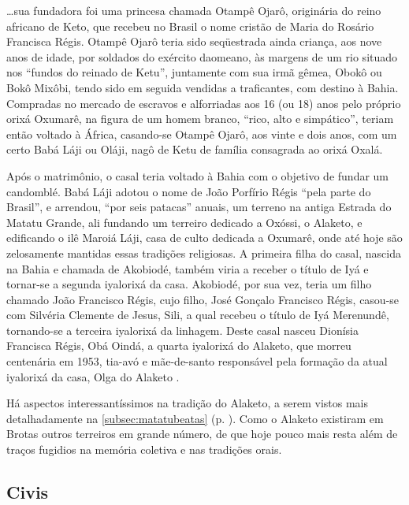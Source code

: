 \begin{citacao}
\dots sua fundadora foi uma princesa chamada Otampê Ojarô, originária do reino africano de Keto, que recebeu no Brasil o nome cristão de Maria do Rosário Francisca Régis. Otampê Ojarô teria sido seqüestrada ainda criança, aos nove anos de idade, por soldados do exército daomeano, às margens de um rio situado nos ``fundos do reinado de Ketu'', juntamente com sua irmã gêmea, Obokô ou Bokô Mixôbi, tendo sido em seguida vendidas a traficantes, com destino à Bahia. Compradas no mercado de escravos e alforriadas aos 16 (ou 18) anos pelo próprio orixá Oxumarê, na figura de um homem branco, ``rico, alto e simpático'', teriam então voltado à África, casando-se Otampê Ojarô, aos vinte e dois anos, com um certo Babá Láji ou Oláji, nagô de Ketu de família consagrada ao orixá Oxalá.

Após o matrimônio, o casal teria voltado à Bahia com o objetivo de fundar um candomblé. Babá Láji adotou o nome de João Porfírio Régis ``pela parte do Brasil'', e arrendou, ``por seis patacas'' anuais, um terreno na antiga Estrada do Matatu Grande, ali fundando um terreiro dedicado a Oxóssi, o Alaketo, e edificando o ilê Maroiá Láji, casa de culto dedicada a Oxumarê, onde até hoje são zelosamente mantidas essas tradições religiosas. A primeira filha do casal, nascida na Bahia e chamada de Akobiodé, também viria a receber o título de Iyá e tornar-se a segunda iyalorixá da casa. Akobiodé, por sua vez, teria um filho chamado João Francisco Régis, cujo filho, José Gonçalo Francisco Régis, casou-se com Silvéria Clemente de Jesus, Sili, a qual recebeu o título de Iyá Merenundê, tornando-se a terceira iyalorixá da linhagem. Deste casal nasceu Dionísia Francisca Régis, Obá Oindá, a quarta iyalorixá do Alaketo, que morreu centenária em 1953, tia-avó e mãe-de-santo responsável pela formação da atual iyalorixá da casa, Olga do Alaketo \cite[p.~345-346]{silveira_alaketo_2003}.
\end{citacao}

Há aspectos interessantíssimos na tradição do Alaketo, a serem vistos mais detalhadamente na \autoref{subsec:matatubeatas} (p. \pageref{subsec:matatubeatas}). Como o Alaketo existiram em Brotas outros terreiros em grande número, de que hoje pouco mais resta além de traços fugidios na memória coletiva e nas tradições orais.

\subsection{Civis}\label{subsec:pontciv}

